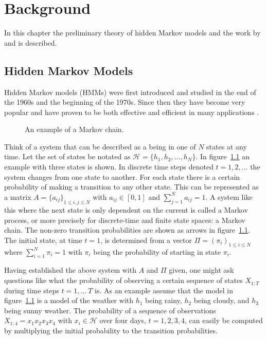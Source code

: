 
\chapter{Background}
\label{cha:background}

In this chapter the preliminary theory of hidden Markov models and
the work by \citet{lifshits2009speeding} and \citet{sand2013ziphmmlib} is
described.

\section{Hidden Markov Models}
\label{sec:hidden-markov-models}

Hidden Markov models (HMMs) were first introduced and
studied in the end of the 1960s and the beginning of the 1970s. Since then they
have become very popular and have proven to be both effective and efficient in
many applications \citep{rabiner1989tutorial}.

\begin{figure}
  \centering
  
  \caption{An example of a Markov chain.}
  \label{fig:markov-chain}
\end{figure}

Think of a system that can be described as a being in one of $N$ states at any
time. Let the set of states be notated as $\mathcal{H} = \{h_1, h_2, \dots, h_N\}$.
In figure~\ref{fig:markov-chain} an example with three states is shown. In
discrete time steps denoted $t = 1, 2, \dots$ the system changes from one state
to another. For each state there is a certain probability
of making a transition to any other state. This can be represented as a matrix
$A = {\{a_{ij}\}}_{1 \le i,j \le N}$ with $a_{ij} \in [0, 1]$ and
$\sum_{j = 1}^N a_{ij} = 1$. A system like this where the next state is only
dependent on the current is called a Markov process, or more precisely
for discrete-time and finite state spaces: a Markov chain. The non-zero
transition probabilities are shown as arrows in
figure~\ref{fig:markov-chain}. The initial state, at time $t = 1$, is
determined from a vector $\Pi = {(\pi_i)}_{1 \le i \le N}$ where
$\sum_{i=1}^N \pi_i = 1$ with $\pi_i$ being the probability of starting in
state $\pi_i$.

Having established the above system with $A$ and $\Pi$ given, one might ask
questions like what the probability of observing a certain sequence of states
$X_{1:T}$ during time steps $t = 1, \dots\ T$ is. As an example assume that the
model in figure~\ref{fig:markov-chain} is a model of the weather with $h_1$
being rainy, $h_2$ being cloudy, and $h_3$ being sunny weather. The probability
of a sequence of observations $X_{1:4} = x_1x_2x_3x_4$ with
$x_i \in \mathcal{H}$ over four days, $t = 1, 2, 3, 4$, can easily be computed
by multiplying the initial probability to the transition probabilities.

